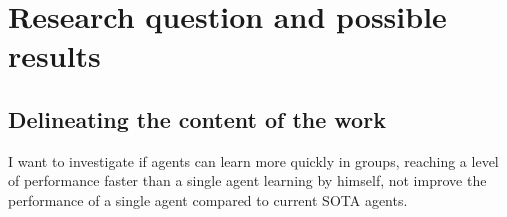 \documentclass[12pt,a4paper]{article}
\begin{document}
\section{Research question and possible results}




\subsection{Delineating the content of the work}



I want to investigate if agents can learn more quickly in groups, reaching a level of performance faster than a single agent learning by himself, not improve the performance of a single agent compared to current \ac{SOTA} agents.

\end{document}
